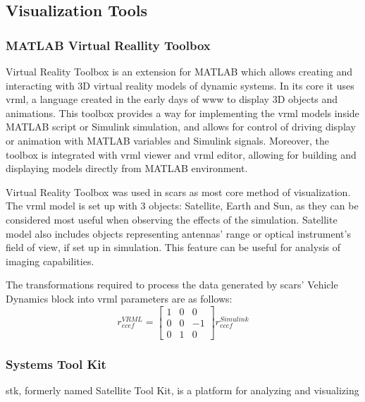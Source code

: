 \subsection{Visualization Tools}
    \subsubsection{MATLAB Virtual Reallity Toolbox}
        Virtual Reality Toolbox is an extension for MATLAB which allows creating and interacting with 3D virtual reality models of dynamic systems. In its core it uses \ac{vrml}, a language created in the early days of \ac{www} to display 3D objects and animations. This toolbox provides a way for implementing the \ac{vrml} models inside MATLAB script or Simulink simulation, and allows for control of driving display or animation with MATLAB variables and Simulink signals. Moreover, the toolbox is integrated with \ac{vrml} viewer and \ac{vrml} editor, allowing for building and displaying models directly from MATLAB environment.

        Virtual Reality Toolbox was used in \ac{scars} as most core method of visualization. The \ac{vrml} model is set up with 3 objects: Satellite, Earth and Sun, as they can be considered most useful when observing the effects of the simulation. Satellite model also includes objects representing antennas' range or optical instrument's field of view, if set up in simulation. This feature can be useful for analysis of imaging capabilities.

        The transformations required to process the data generated by \ac{scars}' Vehicle Dynamics block into \ac{vrml} parameters are as follows:
        \begin{equation}
            r_{ecef}^{VRML}=
            \begin{bmatrix}
            1&0&0\\ 
            0&0&-1\\ 
            0&1&0
            \end{bmatrix}
            r^{Simulink}_{ecef}
        \end{equation}
        
        


    \subsubsection{Systems Tool Kit}
        \ac{stk}, formerly named Satellite Tool Kit, is a platform for analyzing and visualizing 

